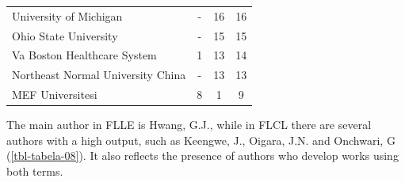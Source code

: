 \documentclass{textolivre}
\begin{document}
\begin{table}[htpb]
\begin{tabular}{lccc}
University of Michigan                                & -  & 16 & 16 \\ 
Ohio State University                                 & -  & 15 & 15 \\ 
Va Boston Healthcare System                           & 1  & 13 & 14 \\ 
Northeast Normal University China                     & -  & 13 & 13 \\ 
MEF Universitesi                                      & 8  & 1  & 9  \\ 
\bottomrule
\end{tabular}
\end{table}

The main author in FLLE is Hwang, G.J., while in FLCL there are several authors with a high output, such as Keengwe, J., Oigara, J.N. and Onchwari, G (\cref{tbl-tabela-08}). It also reflects the presence of authors who develop works using both terms.
\end{document}
